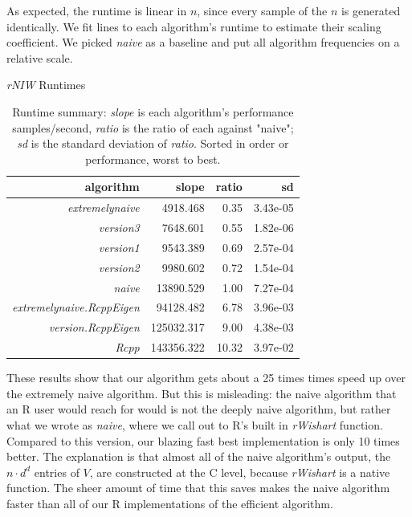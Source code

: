 \documentclass[english]{report}
\begin{document}
As expected, the runtime is linear in $n$, since every sample of the $n$ is generated identically. We fit lines to each algorithm's runtime to estimate their scaling coefficient. We picked \emph{naive} as a baseline and put all algorithm frequencies on a relative scale.

\begin{table}[ht]
\caption{\emph{rNIW} Runtimes}
\begin{center}
\begin{tabular}{rrrr}
    algorithm       & slope  &      ratio   &        sd\\
    \hline
              \emph{extremelynaive}   &4918.468  & 0.35 & 3.43e-05 \\
                \emph{version3}   &7648.601 & 0.55 & 1.82e-06 \\
               \emph{version1}   &9543.389 & 0.69 &2.57e-04 \\
                \emph{version2}   & 9980.602 & 0.72 & 1.54e-04 \\
                   \emph{naive}  &13890.529  & 1.00 & 7.27e-04 \\
  \emph{extremelynaive.RcppEigen} & 94128.482 & 6.78 & 3.96e-03 \\
        \emph{version.RcppEigen} & 125032.317  & 9.00 & 4.38e-03 \\
                     \emph{Rcpp} & 143356.322  & 10.32 & 3.97e-02 \\
    \hline
\end{tabular}
\caption{Runtime summary:     
    \emph{slope} is each algorithm's performance samples/second, \emph{ratio} is the ratio of each against "naive"; \emph{sd} is the standard deviation of \emph{ratio}. Sorted in order or performance, worst to best.}
\end{center}
\label{tab:multicol}
\end{table}


These results show that our algorithm gets about a 25 times times speed up over the extremely naive algorithm. But this is misleading: the naive algorithm that an R user would reach for would is not the deeply naive algorithm, but rather what we wrote as \emph{naive}, where we call out to R's built in \emph{rWishart} function. Compared to this version, our blazing fast best implementation is only 10 times better. The explanation is that almost all of the naive algorithm's output, the $n \cdot d^d$ entries of $V$, are constructed at the C level, because \emph{rWishart} is a native function. The sheer amount of time that this saves makes the naive algorithm faster than all of our R implementations of the efficient algorithm.
\end{document}
